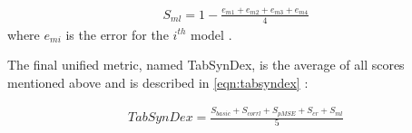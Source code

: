 \begin{description}
  \begin{equation}
    \begin{align*}
      \label{eqn:s_ml}
      S_{ml} = 1-\frac{e_{m1}+e_{m2}+e_{m3}+e_{m4}}{4}
      \end{align*}
  \end{equation}
  where $e_{mi}$ is the error for the $i^{th}$ model \cite{chundawat2022UniversalMetricRobust}.
\end{description}

\item[Similarity Score:]
The final unified metric, named TabSynDex, is the average of all scores mentioned above and is described in \autoref{eqn:tabsyndex} \cite{chundawat2022UniversalMetricRobust}:

\begin{equation}
  \begin{align*}
    \label{eqn:tabsyndex}
    TabSynDex = \frac{S_{basic}+S_{corrl}+S_{pMSE}+S_{cr}+S_{ml}}{5}
    \end{align*}
\end{equation}
